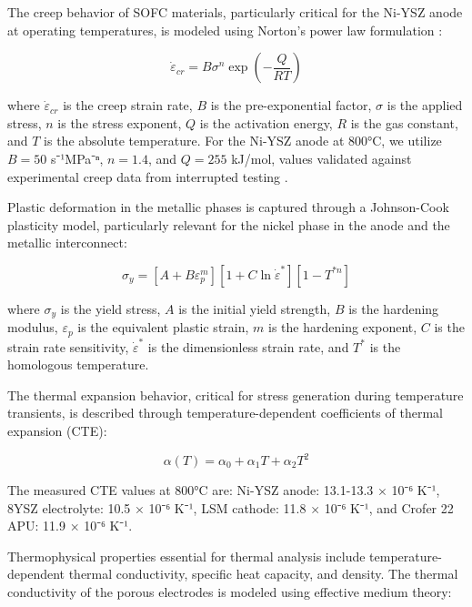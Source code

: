 \documentclass[conference]{IEEEtran}
\begin{document}
The creep behavior of SOFC materials, particularly critical for the Ni-YSZ anode at operating temperatures, is modeled using Norton's power law formulation \cite{frandsen2024creep}:

\begin{equation}
\dot{\varepsilon}_{cr} = B\sigma^n \exp\left(-\frac{Q}{RT}\right)
\end{equation}

where $\dot{\varepsilon}_{cr}$ is the creep strain rate, $B$ is the pre-exponential factor, $\sigma$ is the applied stress, $n$ is the stress exponent, $Q$ is the activation energy, $R$ is the gas constant, and $T$ is the absolute temperature. For the Ni-YSZ anode at 800°C, we utilize $B = 50$ s⁻¹MPa⁻ⁿ, $n = 1.4$, and $Q = 255$ kJ/mol, values validated against experimental creep data from interrupted testing \cite{greco2024creep}.

Plastic deformation in the metallic phases is captured through a Johnson-Cook plasticity model, particularly relevant for the nickel phase in the anode and the metallic interconnect:

\begin{equation}
\sigma_y = [A + B\varepsilon_p^m][1 + C\ln\dot{\varepsilon}^*][1 - T^{*n}]
\end{equation}

where $\sigma_y$ is the yield stress, $A$ is the initial yield strength, $B$ is the hardening modulus, $\varepsilon_p$ is the equivalent plastic strain, $m$ is the hardening exponent, $C$ is the strain rate sensitivity, $\dot{\varepsilon}^*$ is the dimensionless strain rate, and $T^*$ is the homologous temperature.

The thermal expansion behavior, critical for stress generation during temperature transients, is described through temperature-dependent coefficients of thermal expansion (CTE):

\begin{equation}
\alpha(T) = \alpha_0 + \alpha_1 T + \alpha_2 T^2
\end{equation}

The measured CTE values at 800°C are: Ni-YSZ anode: 13.1-13.3 × 10⁻⁶ K⁻¹, 8YSZ electrolyte: 10.5 × 10⁻⁶ K⁻¹, LSM cathode: 11.8 × 10⁻⁶ K⁻¹, and Crofer 22 APU: 11.9 × 10⁻⁶ K⁻¹.

Thermophysical properties essential for thermal analysis include temperature-dependent thermal conductivity, specific heat capacity, and density. The thermal conductivity of the porous electrodes is modeled using effective medium theory:
\end{document}
